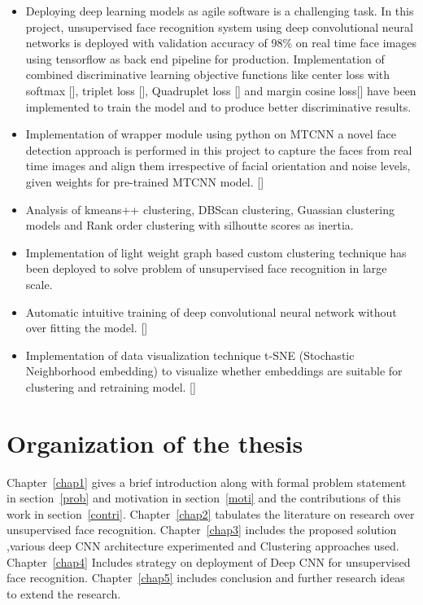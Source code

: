 \documentclass[a4paper,12pt, twoside]{NITKReport}
\begin{document}
\begin{itemize}
\item Deploying deep learning models as agile software is a challenging task. In this project, unsupervised face recognition system using deep convolutional neural networks is deployed with validation accuracy of 98\% on real time face images using tensorflow as back end pipeline for production. Implementation of combined discriminative learning objective functions like center loss with softmax [\cite{wen2016discriminative}], triplet loss [\cite{schroff2015facenet}], Quadruplet loss [\cite{chen2017beyond}] and margin cosine loss[\cite{DBLP:journals/corr/abs-1801-09414}] have been implemented to train the model and to produce better discriminative results.
\item Implementation of wrapper module using python on MTCNN a novel face detection approach is performed in this project to capture the faces from real time images and align them irrespective of facial orientation and noise levels, given weights for pre-trained MTCNN model. [\cite{xiang2017joint}]
\item Analysis of kmeans++ clustering, DBScan clustering, Guassian clustering models and Rank order clustering with silhoutte scores as inertia.
\item Implementation of light weight graph based custom clustering technique has been deployed to solve problem of unsupervised face recognition in large scale. 
\item Automatic intuitive training of deep convolutional neural network without over fitting the model. [\cite{DBLP:journals/corr/CogswellAGZB15}]
\item Implementation of data visualization technique t-SNE (Stochastic Neighborhood embedding) to visualize whether embeddings are suitable for clustering and retraining model. [\cite{maaten2008visualizing}] 

\end{itemize}
	
\section{Organization of the thesis}
	Chapter~\ref{chap1} gives a brief introduction along with formal problem statement in section~\ref{prob} and motivation in section~\ref{moti} and the contributions of this work in section~\ref{contri}. Chapter~\ref{chap2} tabulates the literature on research over unsupervised face recognition. Chapter~\ref{chap3} includes the proposed solution ,various deep CNN architecture experimented and Clustering approaches used. Chapter~\ref{chap4} Includes strategy on deployment of Deep CNN for unsupervised face recognition. Chapter~\ref{chap5} includes conclusion and further research ideas to extend the research.  
	
\end{document}
